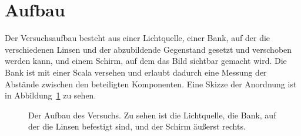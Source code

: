 
\section{Aufbau}

Der Versuchsaufbau besteht aus einer Lichtquelle, einer Bank, auf der
die verschiedenen Linsen und der abzubildende Gegenstand gesetzt und
verschoben werden kann, und einem Schirm, auf dem das Bild sichtbar
gemacht wird. Die Bank ist mit einer Scala versehen und erlaubt dadurch
eine Messung der Abstände zwischen den beteiligten Komponenten. Eine
Skizze der Anordnung ist in Abbildung~\ref{fig:aufbau} zu sehen.

\begin{figure}
  \centering
  \caption{Der Aufbau des Versuchs. Zu sehen ist die Lichtquelle, die
    Bank, auf der die Linsen befestigt sind, und der Schirm äußerst
    rechts.}
  \label{fig:aufbau}
\end{figure}
